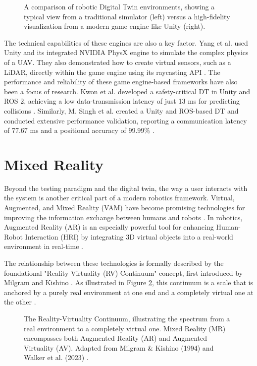 \begin{figure}[h]
\centering
\caption{A comparison of robotic Digital Twin environments, showing a typical view from a traditional simulator (left) versus a high-fidelity visualization from a modern game engine like Unity (right).}
\label{fig:dt_environments}
\end{figure}

The technical capabilities of these engines are also a key factor. Yang et al. used Unity and its integrated NVIDIA PhysX engine to simulate the complex physics of a UAV. They also demonstrated how to create virtual sensors, such as a LiDAR, directly within the game engine using its raycasting API \cite{Yang2020}. The performance and reliability of these game engine-based frameworks have also been a focus of research. Kwon et al. developed a safety-critical DT in Unity and ROS 2, achieving a low data-transmission latency of just 13 ms for predicting collisions \cite{Kwon2025}. Similarly, M. Singh et al. created a Unity and ROS-based DT and conducted extensive performance validation, reporting a communication latency of 77.67 ms and a positional accuracy of 99.99\% \cite{Singh2024b}.

\section{Mixed Reality}
\label{sec:MR}
Beyond the testing paradigm and the digital twin, the way a user interacts with the system is another critical part of a modern robotics framework. Virtual, Augmented, and Mixed Reality (VAM) have become promising technologies for improving the information exchange between humans and robots \cite{Walker2023}. In robotics, Augmented Reality (AR) is an especially powerful tool for enhancing Human-Robot Interaction (HRI) by integrating 3D virtual objects into a real-world environment in real-time \cite{MV20}.

The relationship between these technologies is formally described by the foundational "Reality-Virtuality (RV) Continuum" concept, first introduced by Milgram and Kishino \cite{MK94, Skarbez2021, MV20}. As illustrated in Figure \ref{fig:rv_continuum}, this continuum is a scale that is anchored by a purely real environment at one end and a completely virtual one at the other \cite{MK94, Skarbez2021, MV20}.

\begin{figure}[h]
\centering
\caption{The Reality-Virtuality Continuum, illustrating the spectrum from a real environment to a completely virtual one. Mixed Reality (MR) encompasses both Augmented Reality (AR) and Augmented Virtuality (AV). Adapted from Milgram \& Kishino (1994) \cite{MK94} and Walker et al. (2023) \cite{Walker2023}.}
\label{fig:rv_continuum}
\end{figure}


